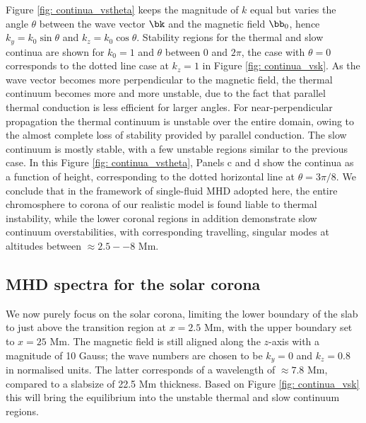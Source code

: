 Figure \ref{fig: continua_vstheta} keeps the magnitude of $k$ equal but varies the angle $\theta$ between the wave vector $\bk$ and the magnetic field $\bb_0$, hence $k_y = k_0\sin\theta$ and $k_z = k_0\cos\theta$. Stability regions for the thermal and slow continua are shown for $k_0 = 1$ and $\theta$ between 0 and $2\pi$, the case with $\theta = 0$ corresponds to the dotted line case at $k_z = 1$ in Figure \ref{fig: continua_vsk}. As the wave vector becomes more perpendicular to the magnetic field, the thermal continuum becomes more and more unstable, due to the fact that parallel thermal conduction is less efficient for larger angles. For near-perpendicular propagation the thermal continuum is unstable over the entire domain, owing to the almost complete loss of stability provided by parallel conduction. The slow continuum is mostly stable, with a few unstable regions similar to the previous case. In this Figure \ref{fig: continua_vstheta}, Panels c and d show the continua as a function of height, corresponding to the dotted horizontal line at $\theta = 3\pi/8$. We conclude that in the framework of single-fluid MHD adopted here, the entire chromosphere to corona of our realistic model is found liable to thermal instability, while the lower coronal regions in addition demonstrate slow continuum overstabilities, with corresponding travelling, singular modes at altitudes between $\approx 2.5 -- 8$ Mm.



\subsection{MHD spectra for the solar corona} \label{ss: corona_spectra}
We now purely focus on the solar corona, limiting the lower boundary of the slab to just above the transition region at $x = 2.5$ Mm, with the upper boundary set to $x = 25$ Mm. The magnetic field is still aligned along the $z$-axis with a magnitude of 10 Gauss; the wave numbers are chosen to be $k_y = 0$ and $k_z = 0.8$ in normalised units. The latter corresponds of a wavelength of $\approx 7.8$ Mm, compared to a slabsize of 22.5 Mm thickness. Based on Figure \ref{fig: continua_vsk} this will bring the equilibrium into the unstable thermal and slow continuum regions.

